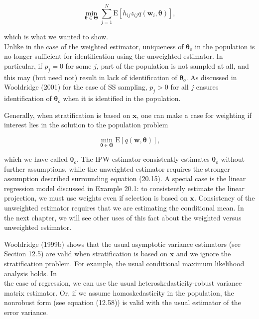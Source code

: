 \documentclass[10pt]{article}
\begin{document}
\begin{equation*}
\min _{\boldsymbol{\theta} \in \boldsymbol{\Theta}} \sum_{j=1}^{N} \mathrm{E}\left[h_{i j} z_{i j} q\left(\mathbf{w}_{i}, \boldsymbol{\theta}\right)\right], \tag{20.19}
\end{equation*}


which is what we wanted to show.\\
Unlike in the case of the weighted estimator, uniqueness of $\boldsymbol{\theta}_{o}$ in the population is no longer sufficient for identification using the unweighted estimator. In particular, if $p_{j}=0$ for some $j$, part of the population is not sampled at all, and this may (but need not) result in lack of identification of $\boldsymbol{\theta}_{o}$. As discussed in Wooldridge (2001) for the case of SS sampling, $p_{j}>0$ for all $j$ ensures identification of $\boldsymbol{\theta}_{o}$ when it is identified in the population.

Generally, when stratification is based on $\mathbf{x}$, one can make a case for weighting if interest lies in the solution to the population problem


\begin{equation*}
\min _{\boldsymbol{\theta} \in \boldsymbol{\Theta}} \mathrm{E}[q(\mathbf{w}, \boldsymbol{\theta})], \tag{20.20}
\end{equation*}


which we have called $\boldsymbol{\theta}_{o}$. The IPW estimator consistently estimates $\boldsymbol{\theta}_{o}$ without further assumptions, while the unweighted estimator requires the stronger assumption described surrounding equation (20.15). A special case is the linear regression model discussed in Example 20.1: to consistently estimate the linear projection, we must use weights even if selection is based on $\mathbf{x}$. Consistency of the unweighted estimator requires that we are estimating the conditional mean. In the next chapter, we will see other uses of this fact about the weighted versus unweighted estimator.

Wooldridge (1999b) shows that the usual asymptotic variance estimators (see Section 12.5) are valid when stratification is based on $\mathbf{x}$ and we ignore the stratification problem. For example, the usual conditional maximum likelihood analysis holds. In\\
the case of regression, we can use the usual heteroskedasticity-robust variance matrix estimator. Or, if we assume homoskedasticity in the population, the nonrobust form (see equation (12.58)) is valid with the usual estimator of the error variance.
\end{document}
